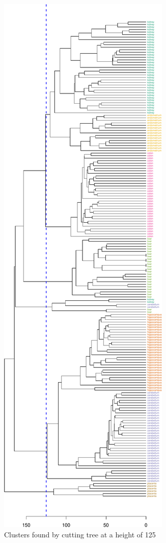 \documentclass[]{book}
\theoremstyle{definition}
\theoremstyle{definition}
\theoremstyle{definition}
\theoremstyle{remark}
\begin{document}
\begin{figure}

{\centering \includegraphics[width=1\linewidth]{09-clustering_files/figure-latex/tissueDendrogramCutHeight-1} 

}

\caption{Clusters found by cutting tree at a height of 125}\label{fig:tissueDendrogramCutHeight}
\end{figure}
\end{document}
